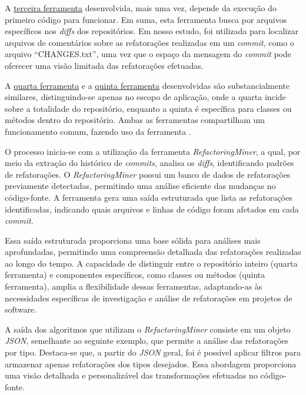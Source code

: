 A \href{https://github.com/BrenoFariasdaSilva/Scientific-Research/blob/main/PyDriller/Scripts/track_files.py}{terceira ferramenta} desenvolvida, mais uma vez, depende da execução do primeiro código para funcionar. Em suma, esta ferramenta busca por arquivos específicos nos \textit{diffs} dos repositórios. Em nosso estudo, foi utilizada para localizar arquivos de comentários sobre as refatorações realizadas em um \textit{commit}, como o arquivo ``CHANGES.txt'', uma vez que o espaço da mensagem do \textit{commit} pode oferecer uma visão limitada das refatorações efetuadas.

A \href{https://github.com/BrenoFariasdaSilva/Scientific-Research/blob/main/PyDriller/Scripts/track_files.py}{quarta ferramenta} e a \href{https://github.com/BrenoFariasdaSilva/Scientific-Research/blob/main/RefactoringMiner/metrics_evolution_refactors.py}{quinta ferramenta} desenvolvidas são substancialmente similares, distinguindo-se apenas no escopo de aplicação, onde a quarta  incide sobre a totalidade do repositório, enquanto a quinta é específica para classes ou métodos dentro do repositório. Ambas as ferramentas compartilham um funcionamento comum, fazendo uso da ferramenta \cite{Tsantalis:ICSE:2018:RefactoringMiner}.

O processo inicia-se com a utilização da ferramenta \textit{RefactoringMiner}, a qual, por meio da extração do histórico de \textit{commits}, analisa os \textit{diffs}, identificando padrões de refatorações. O \textit{RefactoringMiner} possui um banco de dados de refatorações previamente detectadas, permitindo uma análise eficiente das mudanças no código-fonte. A ferramenta gera uma saída estruturada que lista as refatorações identificadas, indicando quais arquivos e linhas de código foram afetados em cada \textit{commit}.

Essa saída estruturada proporciona uma base sólida para análises mais aprofundadas, permitindo uma compreensão detalhada das refatorações realizadas ao longo do tempo. A capacidade de distinguir entre o repositório inteiro (quarta ferramenta) e componentes específicos, como classes ou métodos (quinta ferramenta), amplia a flexibilidade dessas ferramentas, adaptando-as às necessidades específicas de investigação e análise de refatorações em projetos de software.

A saída dos algoritmos que utilizam o \textit{RefactoringMiner} consiste em um objeto \textit{JSON}, semelhante ao seguinte exemplo, que permite a análise das refatorações por tipo. Destaca-se que, a partir do \textit{JSON} geral, foi é possível aplicar filtros para armazenar apenas refatorações dos tipos desejados. Essa abordagem proporciona uma visão detalhada e personalizável das transformações efetuadas no código-fonte.

